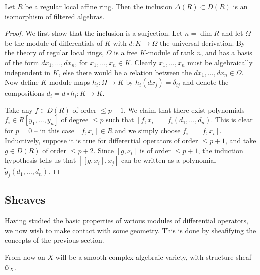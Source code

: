 \begin{theorem}
    Let $R$ be a regular local affine ring. Then the inclusion $\Delta(R)\subset D(R)$
    is an isomorphism of filtered algebras.
    \label{thm:localcase}
\end{theorem}
\begin{proof}
    We first show that the inclusion is a surjection.
    Let $n=\dim R$ and let $\Omega$ be the module of differentials of $K$ with $d:K\to\Omega$
    the universal derivation. By the theory of regular local rings, $\Omega$ is a free $K$-module
    of rank $n$, and has a basis of the form $dx_1,\ldots, dx_n$, for $x_1,\ldots,x_n\in K$.
    Clearly $x_1,\ldots,x_n$ must be algebraically independent in $K$, else there would be
    a relation between the $dx_1,\ldots,dx_n\in\Omega$. Now define $K$-module maps $h_i:\Omega\to K$
    by $h_i(dx_j)=\delta_{ij}$ and denote the compositions $d_i = d\circ h_i:K\to K.$

    Take any $f\in D(R)$ of order $\leqslant p+1$. We claim that there exist polynomials
    $f_i\in R[y_1,\ldots,y_n]$ of degree $\leqslant p$ such that $[f,x_i]=f_i(d_1,\ldots,d_n)$.
    This is clear for $p=0$ --
    in this case $[f,x_i]\in R$ and we simply choose $f_i=[f,x_i]$. Inductively, suppose
    it is true for differential operators of order $\leqslant p+1$, and take $g\in D(R)$
    of order $\leqslant p+2$. Since $[g,x_i]$ is of order $\leqslant p+1$, the induction
    hypothesis tells us that $[[g,x_i],x_j]$ can be written as a polynomial
    $\tilde g_j(d_1,\ldots,d_n)$.
\end{proof}


\subsection{Sheaves}

Having studied the basic properties of various modules of differential operators,
we now wish to make contact with some geometry. This is done by sheafifying the concepts
of the previous section.

From now on $X$ will be a smooth complex algebraic variety, with structure sheaf $\mathcal{O}_X$.

